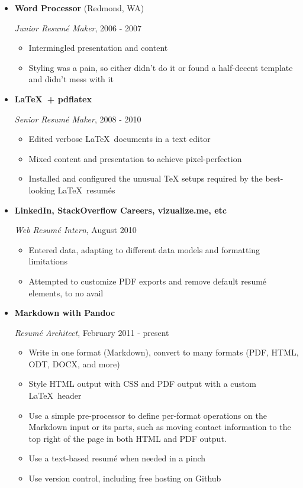 \documentclass[]{article}
\begin{document}
\begin{itemize}
\item
  \textbf{Word Processor} (Redmond, WA)

  \emph{Junior Resumé Maker}, 2006 - 2007

  \begin{itemize}
  \itemsep1pt\parskip0pt
  \item
    Intermingled presentation and content
  \item
    Styling was a pain, so either didn't do it or found a half-decent
    template and didn't mess with it
  \end{itemize}
\item
  \textbf{\LaTeX~+ pdflatex}

  \emph{Senior Resumé Maker}, 2008 - 2010

  \begin{itemize}
  \itemsep1pt\parskip0pt
  \item
    Edited verbose \LaTeX~documents in a text editor
  \item
    Mixed content and presentation to achieve pixel-perfection
  \item
    Installed and configured the unusual TeX setups required by the
    best-looking \LaTeX~resumés
  \end{itemize}
\item
  \textbf{LinkedIn, StackOverflow Careers, vizualize.me, etc}

  \emph{Web Resumé Intern}, August 2010

  \begin{itemize}
  \itemsep1pt\parskip0pt
  \item
    Entered data, adapting to different data models and formatting
    limitations
  \item
    Attempted to customize PDF exports and remove default resumé
    elements, to no avail
  \end{itemize}
\item
  \textbf{Markdown with Pandoc}

  \emph{Resumé Architect}, February 2011 - present

  \begin{itemize}
  \itemsep1pt\parskip0pt
  \item
    Write in one format (Markdown), convert to many formats (PDF, HTML,
    ODT, DOCX, and more)
  \item
    Style HTML output with CSS and PDF output with a custom
    \LaTeX~header
  \item
    Use a simple pre-processor to define per-format operations on the
    Markdown input or its parts, such as moving contact information to
    the top right of the page in both HTML and PDF output.
  \item
    Use a text-based resumé when needed in a pinch
  \item
    Use version control, including free hosting on Github
  \end{itemize}
\end{itemize}
\end{document}

